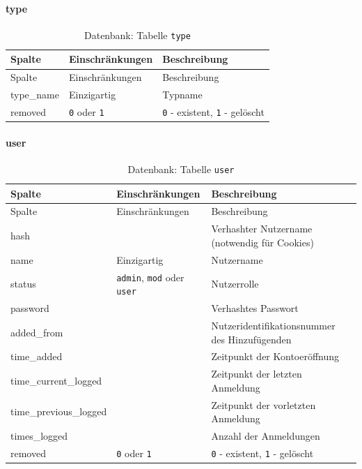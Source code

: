 \documentclass[
]{article}
\begin{document}
\hypertarget{type-1}{%
\paragraph{type}\label{type-1}}

\begin{longtable}[]{@{}lll@{}}
\caption{\label{tab:type} Datenbank: Tabelle \texttt{type}}\tabularnewline
\toprule
Spalte & Einschränkungen & Beschreibung \\
\midrule
\endfirsthead
\toprule
Spalte & Einschränkungen & Beschreibung \\
\midrule
\endhead
type\_name & Einzigartig & Typname \\
removed & \texttt{0} oder \texttt{1} & \texttt{0} - existent, \texttt{1} - gelöscht \\
\bottomrule
\end{longtable}

\hypertarget{user}{%
\paragraph{user}\label{user}}

\begin{longtable}[]{@{}lll@{}}
\caption{\label{tab:user} Datenbank: Tabelle \texttt{user}}\tabularnewline
\toprule
Spalte & Einschränkungen & Beschreibung \\
\midrule
\endfirsthead
\toprule
Spalte & Einschränkungen & Beschreibung \\
\midrule
\endhead
hash & & Verhashter Nutzername (notwendig für Cookies) \\
name & Einzigartig & Nutzername \\
status & \texttt{admin}, \texttt{mod} oder \texttt{user} & Nutzerrolle \\
password & & Verhashtes Passwort \\
added\_from & & Nutzeridentifikationsnummer des Hinzufügenden \\
time\_added & & Zeitpunkt der Kontoeröffnung \\
time\_current\_logged & & Zeitpunkt der letzten Anmeldung \\
time\_previous\_logged & & Zeitpunkt der vorletzten Anmeldung \\
times\_logged & & Anzahl der Anmeldungen \\
removed & \texttt{0} oder \texttt{1} & \texttt{0} - existent, \texttt{1} - gelöscht \\
\bottomrule
\end{longtable}
\end{document}
